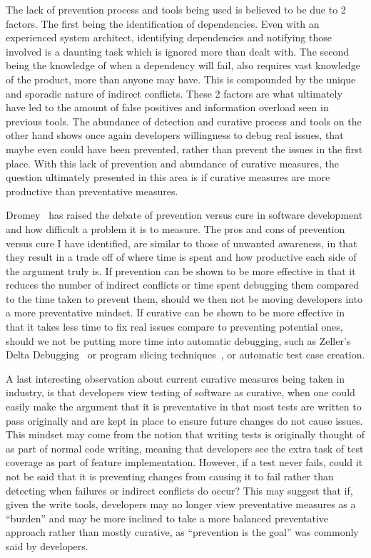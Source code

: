 The lack of prevention process and tools being used is believed to be due to 2 factors. The first being the identification of dependencies.
Even with an experienced system architect, identifying dependencies and notifying those involved is a daunting task 
which is ignored more than dealt with. The second being the knowledge of when a dependency will fail, also requires vast knowledge
of the product, more than anyone may have. This is compounded by the unique and sporadic nature of indirect conflicts. These 2 factors
are what ultimately have led to the amount of false positives and information overload seen in previous tools. The
abundance of detection and curative process and tools on the other hand shows once again developers willingness to debug
real issues, that maybe even could have been prevented, rather than prevent the issues in the first place. With
this lack of prevention and abundance of curative measures, the question ultimately presented in this area is if 
curative measures are more productive than preventative measures.

Dromey~\cite{Dromey:2003} has raised the debate of prevention versus cure in software development and how difficult a problem it is
to measure. The pros and cons of prevention versus cure I have identified, are similar to those of unwanted awareness,
in that they result in a trade off 
of where time is spent and how productive each side of the argument truly is. If prevention can be shown to be more effective in that
it reduces the number of indirect conflicts or time spent debugging them compared to the time taken to prevent them, should we then
not be moving developers into a more preventative mindset. If curative can be shown to be more effective in that it takes less time
to fix real issues compare to preventing potential ones, should we not be putting more time into automatic debugging, such as
Zeller's Delta Debugging~\cite{Zeller:2002:ICC} or program slicing techniques~\cite{Weiser:1982:PUS}, or automatic test case creation.

A last interesting observation about current curative measures being taken in industry, is that developers view testing of software 
as curative, when one could easily make the argument that it is preventative in that most tests are written to pass originally and
are kept in place to ensure future changes do not cause issues. This mindset may come from the notion that writing tests is originally
thought of as part of normal code writing, meaning that developers see the extra task of test coverage as part of feature implementation.
However, if a test never fails, could it not be said that it is preventing changes from causing it to fail rather than detecting
when failures or indirect conflicts do occur? This may suggest that if, given the write tools, developers may no longer view preventative
measures as a ``burden'' and may be more inclined to take a more balanced preventative approach rather than mostly curative, as
``prevention is the goal'' was commonly said by developers.

